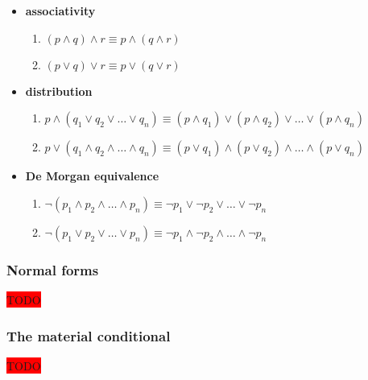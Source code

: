 \documentclass[12pt, letterpaper]{article}
\begin{document}
\begin{itemize}
  \item \textbf{associativity}
    \begin{enumerate}
      \item $(p \land q) \land r \equiv p \land (q \land r)$
      \item $(p \lor q) \lor r \equiv p \lor (q \lor r)$
    \end{enumerate}
  \item \textbf{distribution}
    \begin{enumerate}
      \item $p \land (q_1 \lor q_2 \lor \ldots \lor q_n) \equiv (p \land q_1)
        \lor (p \land q_2) \lor \ldots \lor (p \land q_n)$
      \item $p \lor (q_1 \land q_2 \land \ldots \land q_n) \equiv (p \lor q_1)
        \land (p \lor q_2) \land \ldots \land (p \lor q_n)$
    \end{enumerate}
  \item \textbf{De Morgan equivalence}
    \begin{enumerate}
      \item $\lnot (p_1 \land p_2 \land \ldots \land p_n) \equiv \lnot p_1
        \lor \lnot p_2 \lor \ldots \lor \lnot p_n$
      \item $\lnot (p_1 \lor p_2 \lor \ldots \lor p_n) \equiv \lnot p_1
        \land \lnot p_2 \land \ldots \land \lnot p_n$
    \end{enumerate}
\end{itemize}

\subsubsection{Normal forms}

\colorbox{red}{TODO}

\subsubsection{The material conditional}

\colorbox{red}{TODO}
\end{document}
